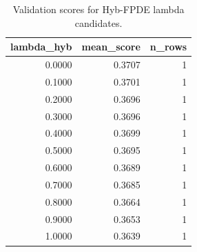\begin{table}[t]
\caption{Validation scores for Hyb-FPDE lambda candidates.}
\label{tab:lambda_distribution_computed}
\centering
\begin{tabular}{rrr}
\toprule
lambda\_hyb & mean\_score & n\_rows \\
\midrule
0.0000 & 0.3707 & 1 \\
0.1000 & 0.3701 & 1 \\
0.2000 & 0.3696 & 1 \\
0.3000 & 0.3696 & 1 \\
0.4000 & 0.3699 & 1 \\
0.5000 & 0.3695 & 1 \\
0.6000 & 0.3689 & 1 \\
0.7000 & 0.3685 & 1 \\
0.8000 & 0.3664 & 1 \\
0.9000 & 0.3653 & 1 \\
1.0000 & 0.3639 & 1 \\
\bottomrule
\end{tabular}

\end{table}
